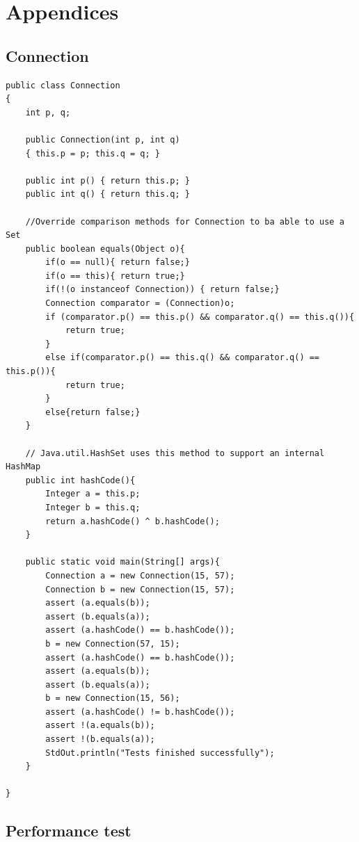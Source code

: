 \documentclass{article}
\begin{document}
\appendix
\renewcommand\thesubsection{A.\Roman{subsection}}
\section{Appendices}

\subsection{Connection}

\begin{lstlisting}[caption=Connection class with methods overridden., label=lst:con]
public class Connection
{
    int p, q;
    
    public Connection(int p, int q) 
    { this.p = p; this.q = q; }

    public int p() { return this.p; }
    public int q() { return this.q; }

    //Override comparison methods for Connection to ba able to use a Set
    public boolean equals(Object o){
        if(o == null){ return false;}
        if(o == this){ return true;}
        if(!(o instanceof Connection)) { return false;}
        Connection comparator = (Connection)o;
        if (comparator.p() == this.p() && comparator.q() == this.q()){
            return true;
        }
        else if(comparator.p() == this.q() && comparator.q() == this.p()){
            return true;
        }
        else{return false;}
    }

    // Java.util.HashSet uses this method to support an internal HashMap
    public int hashCode(){
        Integer a = this.p;
        Integer b = this.q;
        return a.hashCode() ^ b.hashCode();
    }

    public static void main(String[] args){
        Connection a = new Connection(15, 57);
        Connection b = new Connection(15, 57);
        assert (a.equals(b));
        assert (b.equals(a));
        assert (a.hashCode() == b.hashCode());
        b = new Connection(57, 15);
        assert (a.hashCode() == b.hashCode());
        assert (a.equals(b));
        assert (b.equals(a));
        b = new Connection(15, 56);
        assert (a.hashCode() != b.hashCode());
        assert !(a.equals(b));
        assert !(b.equals(a));
        StdOut.println("Tests finished successfully");
    }
	    
}
\end{lstlisting}
\pagebreak

\subsection{Performance test}
\end{document}
